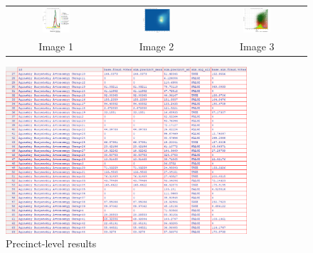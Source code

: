 \documentclass{article}
\begin{document}
\begin{figure}[h]
\centering
\begin{tabular}{ccc}
\includegraphics[width=0.3\textwidth]{inst/figures/img_national1.png} &
\includegraphics[width=0.3\textwidth]{inst/figures/img_national2.png} &
\includegraphics[width=0.3\textwidth]{inst/figures/img_national3.png} \\
Image 1 & Image 2 & Image 3 \\
\end{tabular}
\end{figure}

\begin{figure}[h]
\centering
\includegraphics[width=0.8\textwidth]{inst/figures/EFT_table2.png}
\caption{Precinct-level results}
\end{figure}
\end{document}
